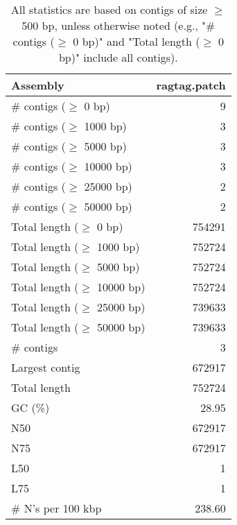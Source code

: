 \documentclass[12pt,a4paper]{article}
\begin{document}
\begin{table}[ht]
\begin{center}
\caption{All statistics are based on contigs of size $\geq$ 500 bp, unless otherwise noted (e.g., "\# contigs ($\geq$ 0 bp)" and "Total length ($\geq$ 0 bp)" include all contigs).}
\begin{tabular}{|l*{1}{|r}|}
\hline
Assembly & ragtag.patch \\ \hline
\# contigs ($\geq$ 0 bp) & 9 \\ \hline
\# contigs ($\geq$ 1000 bp) & 3 \\ \hline
\# contigs ($\geq$ 5000 bp) & 3 \\ \hline
\# contigs ($\geq$ 10000 bp) & 3 \\ \hline
\# contigs ($\geq$ 25000 bp) & 2 \\ \hline
\# contigs ($\geq$ 50000 bp) & 2 \\ \hline
Total length ($\geq$ 0 bp) & 754291 \\ \hline
Total length ($\geq$ 1000 bp) & 752724 \\ \hline
Total length ($\geq$ 5000 bp) & 752724 \\ \hline
Total length ($\geq$ 10000 bp) & 752724 \\ \hline
Total length ($\geq$ 25000 bp) & 739633 \\ \hline
Total length ($\geq$ 50000 bp) & 739633 \\ \hline
\# contigs & 3 \\ \hline
Largest contig & 672917 \\ \hline
Total length & 752724 \\ \hline
GC (\%) & 28.95 \\ \hline
N50 & 672917 \\ \hline
N75 & 672917 \\ \hline
L50 & 1 \\ \hline
L75 & 1 \\ \hline
\# N's per 100 kbp & 238.60 \\ \hline
\end{tabular}
\end{center}
\end{table}
\end{document}
